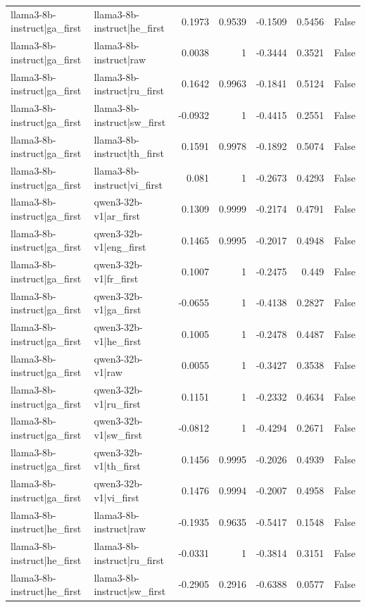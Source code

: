 \begin{table}
\begin{tabular}{l l r r r r l}
llama3-8b-instruct|ga_first & llama3-8b-instruct|he_first & 0.1973 & 0.9539 & -0.1509 & 0.5456 & False \\
llama3-8b-instruct|ga_first & llama3-8b-instruct|raw & 0.0038 & 1 & -0.3444 & 0.3521 & False \\
llama3-8b-instruct|ga_first & llama3-8b-instruct|ru_first & 0.1642 & 0.9963 & -0.1841 & 0.5124 & False \\
llama3-8b-instruct|ga_first & llama3-8b-instruct|sw_first & -0.0932 & 1 & -0.4415 & 0.2551 & False \\
llama3-8b-instruct|ga_first & llama3-8b-instruct|th_first & 0.1591 & 0.9978 & -0.1892 & 0.5074 & False \\
llama3-8b-instruct|ga_first & llama3-8b-instruct|vi_first & 0.081 & 1 & -0.2673 & 0.4293 & False \\
llama3-8b-instruct|ga_first & qwen3-32b-v1|ar_first & 0.1309 & 0.9999 & -0.2174 & 0.4791 & False \\
llama3-8b-instruct|ga_first & qwen3-32b-v1|eng_first & 0.1465 & 0.9995 & -0.2017 & 0.4948 & False \\
llama3-8b-instruct|ga_first & qwen3-32b-v1|fr_first & 0.1007 & 1 & -0.2475 & 0.449 & False \\
llama3-8b-instruct|ga_first & qwen3-32b-v1|ga_first & -0.0655 & 1 & -0.4138 & 0.2827 & False \\
llama3-8b-instruct|ga_first & qwen3-32b-v1|he_first & 0.1005 & 1 & -0.2478 & 0.4487 & False \\
llama3-8b-instruct|ga_first & qwen3-32b-v1|raw & 0.0055 & 1 & -0.3427 & 0.3538 & False \\
llama3-8b-instruct|ga_first & qwen3-32b-v1|ru_first & 0.1151 & 1 & -0.2332 & 0.4634 & False \\
llama3-8b-instruct|ga_first & qwen3-32b-v1|sw_first & -0.0812 & 1 & -0.4294 & 0.2671 & False \\
llama3-8b-instruct|ga_first & qwen3-32b-v1|th_first & 0.1456 & 0.9995 & -0.2026 & 0.4939 & False \\
llama3-8b-instruct|ga_first & qwen3-32b-v1|vi_first & 0.1476 & 0.9994 & -0.2007 & 0.4958 & False \\
llama3-8b-instruct|he_first & llama3-8b-instruct|raw & -0.1935 & 0.9635 & -0.5417 & 0.1548 & False \\
llama3-8b-instruct|he_first & llama3-8b-instruct|ru_first & -0.0331 & 1 & -0.3814 & 0.3151 & False \\
llama3-8b-instruct|he_first & llama3-8b-instruct|sw_first & -0.2905 & 0.2916 & -0.6388 & 0.0577 & False \\

\end{tabular}
\end{table}

